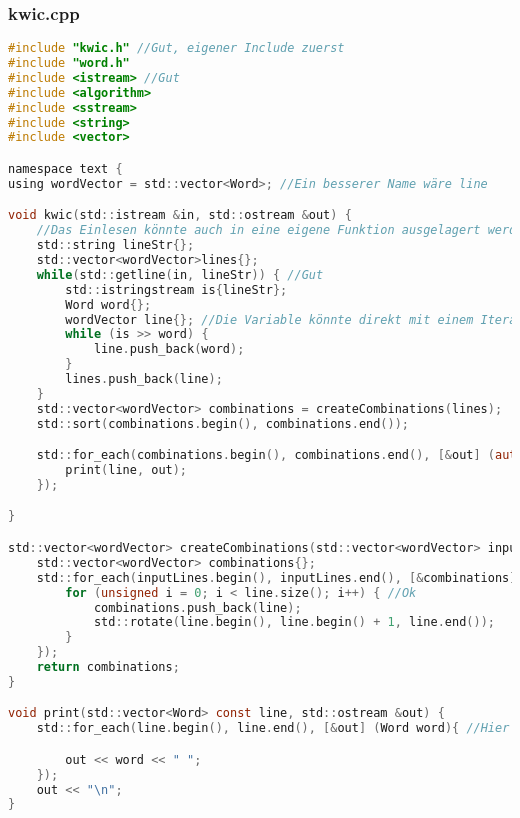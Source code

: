 \subsubsection{kwic.cpp}
\begin{lstlisting}[style=frame, style= linenumbers, language=C]
#include "kwic.h" //Gut, eigener Include zuerst
#include "word.h"
#include <istream> //Gut
#include <algorithm>
#include <sstream>
#include <string>
#include <vector>

namespace text {
using wordVector = std::vector<Word>; //Ein besserer Name wäre line

void kwic(std::istream &in, std::ostream &out) {
	//Das Einlesen könnte auch in eine eigene Funktion ausgelagert werden
	std::string lineStr{};
	std::vector<wordVector>lines{};
	while(std::getline(in, lineStr)) { //Gut
		std::istringstream is{lineStr};
		Word word{};
		wordVector line{}; //Die Variable könnte direkt mit einem Iterator-Paar initialisiert werden
		while (is >> word) {
			line.push_back(word);
		}
		lines.push_back(line);
	}
	std::vector<wordVector> combinations = createCombinations(lines);
	std::sort(combinations.begin(), combinations.end());

	std::for_each(combinations.begin(), combinations.end(), [&out] (auto line) {
		print(line, out);
	});

}

std::vector<wordVector> createCombinations(std::vector<wordVector> inputLines) { //Rotations
	std::vector<wordVector> combinations{};
	std::for_each(inputLines.begin(), inputLines.end(), [&combinations] (wordVector line) {
		for (unsigned i = 0; i < line.size(); i++) { //Ok
			combinations.push_back(line);
			std::rotate(line.begin(), line.begin() + 1, line.end());
		}
	});
	return combinations;
}

void print(std::vector<Word> const line, std::ostream &out) {
	std::for_each(line.begin(), line.end(), [&out] (Word word){ //Hier könnte besser mit dem copy-Algorithmus gearbeitet werden.

		out << word << " ";
	});
	out << "\n";
}
\end{lstlisting}